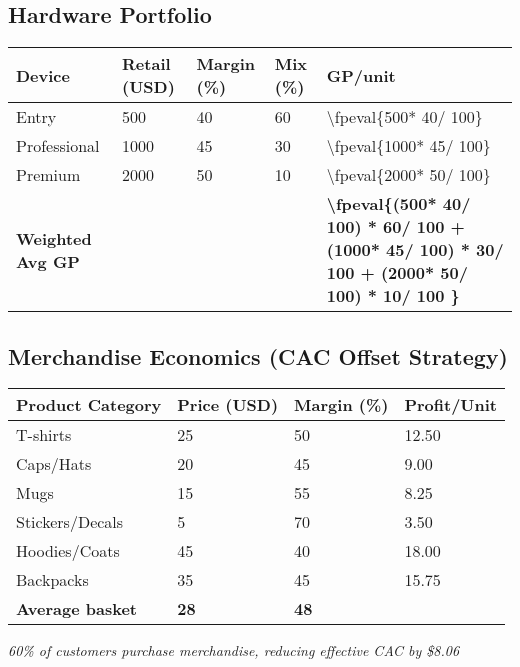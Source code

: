 \documentclass[11pt]{article}
\newcommand{\numfpeval}[1]{\num{\fpeval{#1}}}
\newcommand{\hwEntryPrice}{500}
\newcommand{\hwEntryMargin}{40}
\newcommand{\hwEntryMix}{60}
\newcommand{\hwProfPrice}{1000}
\newcommand{\hwProfMargin}{45}
\newcommand{\hwProfMix}{30}
\newcommand{\hwPremiumPrice}{2000}
\newcommand{\hwPremiumMargin}{50}
\newcommand{\hwPremiumMix}{10}
\newcommand{\merchAvgPrice}{28}
\newcommand{\merchAvgMargin}{48}
\newcommand{\merchAvgProfit}{\fpeval{\merchAvgPrice * \merchAvgMargin / 100}}
\newcommand{\merchAttachRate}{60}
\begin{document}
\subsection{Hardware Portfolio}
\begin{table}[H]
\centering
\begin{tabularx}{\linewidth}{l Y Y Y Y}
\toprule
Device & Retail (USD) & Margin (\%)\cite{industrybenchmark2024} & Mix (\%) & GP/unit \\\midrule
Entry        & \num{\hwEntryPrice}  & \num{\hwEntryMargin} & \num{\hwEntryMix} & \numfpeval{\hwEntryPrice * \hwEntryMargin / 100} \\
Professional & \num{\hwProfPrice} & \num{\hwProfMargin} & \num{\hwProfMix} & \numfpeval{\hwProfPrice * \hwProfMargin / 100} \\
Premium      & \num{\hwPremiumPrice} & \num{\hwPremiumMargin} & \num{\hwPremiumMix} & \numfpeval{\hwPremiumPrice * \hwPremiumMargin / 100} \\\midrule
\textbf{Weighted Avg GP} &  &  &  & \textbf{\numfpeval{(\hwEntryPrice * \hwEntryMargin / 100) * \hwEntryMix / 100 + (\hwProfPrice * \hwProfMargin / 100) * \hwProfMix / 100 + (\hwPremiumPrice * \hwPremiumMargin / 100) * \hwPremiumMix / 100 }} \\
\bottomrule
\end{tabularx}
\end{table}

\subsection{Merchandise Economics (CAC Offset Strategy)}
\begin{table}[H]
\centering
\begin{tabularx}{\linewidth}{l Y Y Y}
\toprule
Product Category & Price (USD) & Margin (\%)\cite{printful2023} & Profit/Unit \\\midrule
T-shirts & 25 & 50 & 12.50 \\
Caps/Hats & 20 & 45 & 9.00 \\
Mugs & 15 & 55 & 8.25 \\
Stickers/Decals & 5 & 70 & 3.50 \\
Hoodies/Coats & 45 & 40 & 18.00 \\
Backpacks & 35 & 45 & 15.75 \\\midrule
\textbf{Average basket} & \textbf{\merchAvgPrice} & \textbf{\merchAvgMargin} & \textbf{\merchAvgProfit} \\
\bottomrule
\end{tabularx}
\end{table}
\textit{\merchAttachRate\% of customers purchase merchandise, reducing effective CAC by \$8.06}\cite{shopify2024}
\end{document}
